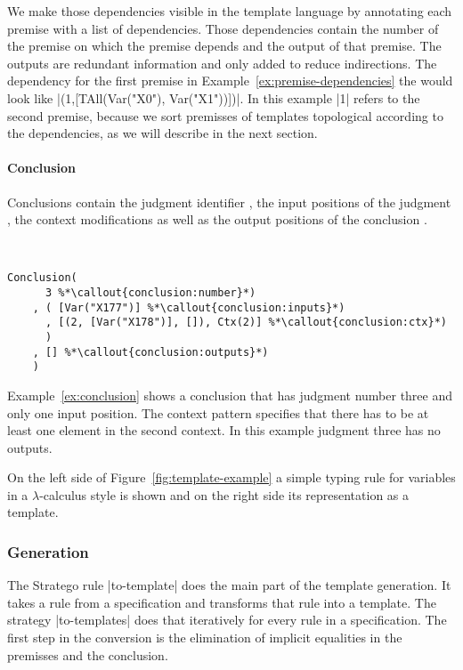We make those dependencies visible in the template language by
annotating each premise with a list of dependencies. Those
dependencies contain the number of the premise on which the premise
depends and the output of that premise. The outputs are redundant
information and only added to reduce indirections.
The dependency for the first premise in
Example~\ref{ex:premise-dependencies} the would look like
\code|(1,[TAll(Var("X0"), Var("X1"))])|. In this example \code|1| refers to the
second premise, because we sort premisses of templates topological
according to the dependencies, as we will describe in the next
section.

\paragraph{Conclusion}
Conclusions contain the judgment identifier
, the input positions of the judgment
, the context modifications
 as well as the output positions of the
conclusion .

\begin{example}{~}
\begin{lstlisting}[language=sltc]
Conclusion(
      3 %*\callout{conclusion:number}*)
    , ( [Var("X177")] %*\callout{conclusion:inputs}*)
      , [(2, [Var("X178")], []), Ctx(2)] %*\callout{conclusion:ctx}*)
      )
    , [] %*\callout{conclusion:outputs}*)
    )
\end{lstlisting}
\label{ex:conclusion}
\end{example}

Example~\ref{ex:conclusion} shows a conclusion that has judgment
number three and only one input position. The context pattern specifies
that there has to be at least one element in the second context. In
this example judgment three has no outputs.

On the left side of Figure~\ref{fig:template-example} a simple typing
rule for variables in a $\lambda$-calculus style is shown and on the
right side its representation as a template.

\subsubsection{Generation}
The Stratego rule \code|to-template| does the main part of the
template generation. It takes a rule from a specification and
transforms that rule into a template. The strategy \code|to-templates| does
that iteratively for every rule in a specification. The first step in
the conversion is the elimination of implicit equalities in the
premisses and the conclusion.


